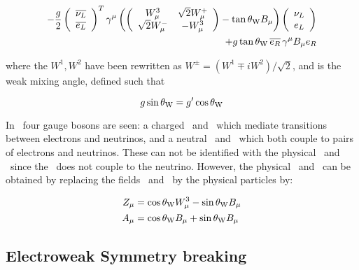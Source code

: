 \begin{equation}
\begin{split}
- \frac{g}{2}
\left( \begin{array}{c}\overline{\nu_{L}} \\  \overline{e_{L}} \end{array} \right)^{T}
\gamma^{\mu} \left(
\left( \begin{array}{cc} W^{3}_{\mu} & \sqrt{2} W^{+}_{\mu} \\ \sqrt{2} W^{-}_{\mu} & -
W^{3}_{\mu} \end{array} \right)
- \tan{\ensuremath{\theta_{\mathrm{W}}}} B_{\mu} \right)
\left( \begin{array}{c} \nu_{L} \\  e_{L} \end{array} \right) \\
+ g \tan{\ensuremath{\theta_{\mathrm{W}}}} \, \overline{e_{R}} \, \gamma^{\mu} B_{\mu} e_{R}
\end{split}
\label{eqn:ew-lepton-interaction}
\end{equation}

where the $W^{1}, W^{2}$ have been rewritten as $W^{\pm} = (W^{1} \mp
iW^{2})/\sqrt{2}$, and \thetaW is the weak mixing angle, defined such that

\begin{equation}
g \sin{\ensuremath{\theta_{\mathrm{W}}}} = g' \cos{\ensuremath{\theta_{\mathrm{W}}}}
\end{equation}

In~ four gauge bosons are seen: a charged \Wp\ and
\Wm\ which mediate transitions between electrons and neutrinos, and a neutral
\Wthreemu\ and \Bmu\ which both couple to pairs of electrons and neutrinos.
These can not be identified with the physical \Z\ and \photon\ since the
\photon\ does not couple to the neutrino.  However, the physical \Z\ and
\photon\ can be obtained by replacing the fields \Wthreemu\ and \Bmu\ by the
physical particles by:

\begin{align}
Z_{\mu} & = \cos{\ensuremath{\theta_{\mathrm{W}}}} W^{3}_{\mu} - \sin{\ensuremath{\theta_{\mathrm{W}}}} B_{\mu} \\
A_{\mu} & = \cos{\ensuremath{\theta_{\mathrm{W}}}} B_{\mu} + \sin{\ensuremath{\theta_{\mathrm{W}}}} B_{\mu} 
\end{align}

\subsection{Electroweak Symmetry breaking}


